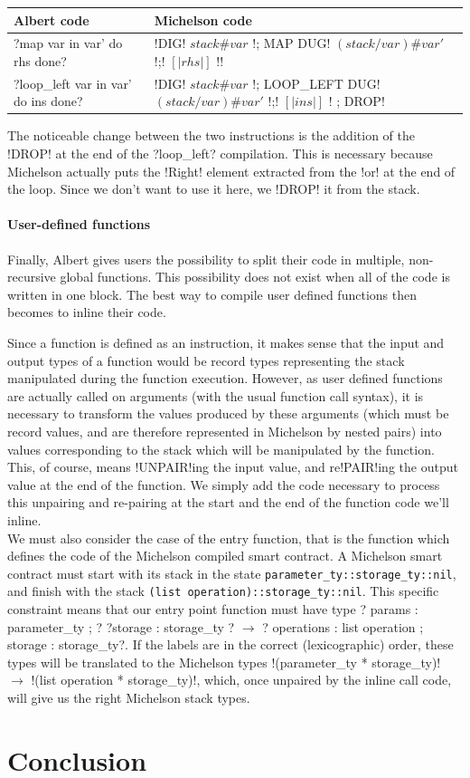 \documentclass{report}
\begin{document}
{\small
\begin{longtable}{p{5cm}|p{11cm}}
  Albert code & Michelson code\\
  \hline
  ?map var in var' do rhs done? & !DIG! $stack\#var$ !; MAP { DUG! $(stack/var)\#var'$ !;! $[|rhs|]$ !}!\\
  \hline
  ?loop_left var in var' do ins done? & !DIG! $stack\#var$ !; LOOP_LEFT { DUG! $(stack/var)\#var'$ !;! $[|ins|]$ !} ; DROP!
\end{longtable}
}

The noticeable change between the two instructions is the addition of the !DROP! at the end of the ?loop_left? compilation. This is necessary because Michelson actually puts the !Right! element extracted from the !or! at the end of the loop. Since we don't want to use it here, we !DROP! it from the stack.

\subsubsection{User-defined functions}
\label{functComp}

Finally, Albert gives users the possibility to split their code in multiple, non-recursive global functions. This possibility does not exist when all of the code is written in one block. The best way to compile user defined functions then becomes to inline their code.

Since a function is defined as an instruction, it makes sense that the input and output types of a function would be record types representing the stack manipulated during the function execution. However, as user defined functions are actually called on arguments (with the usual function call syntax), it is necessary to transform the values produced by these arguments (which must be record values, and are therefore represented in Michelson by nested pairs) into values corresponding to the stack which will be manipulated by the function. This, of course, means !UNPAIR!ing the input value, and re!PAIR!ing the output value at the end of the function. We simply add the code necessary to process this unpairing and re-pairing at the start and the end of the function code we'll inline.\\

We must also consider the case of the entry function, that is the function which defines the code of the Michelson compiled smart contract. A Michelson smart contract must start with its stack in the state \texttt{parameter\_ty::storage\_ty::nil}, and finish with the stack \texttt{(list operation)::storage\_ty::nil}. This specific constraint means that our entry point function must have type ?{ params : parameter_ty ; ? ?storage : storage_ty }? $\rightarrow$ ?{ operations : list operation ; storage : storage_ty}?. If the labels are in the correct (lexicographic) order, these types will be translated to the Michelson types !(parameter_ty * storage_ty)! $\rightarrow$ !(list operation * storage_ty)!, which, once unpaired by the inline call code, will give us the right Michelson stack types.

\chapter*{Conclusion}

{}

\end{document}
